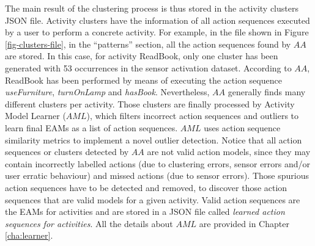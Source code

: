 The main result of the clustering process is thus stored in the activity clusters JSON file. Activity clusters have the information of all action sequences executed by a user to perform a concrete activity. For example, in the file shown in Figure \ref{fig-clusters-file}, in the ``patterns'' section, all the action sequences found by $AA$ are stored. In this case, for activity ReadBook, only one cluster has been generated with 53 occurrences in the sensor activation dataset. According to $AA$, ReadBook has been performed by means of executing the action sequence \textit{useFurniture}, \textit{turnOnLamp} and \textit{hasBook}. Nevertheless, $AA$ generally finds many different clusters per activity. Those clusters are finally processed by Activity Model Learner ($AML$), which filters incorrect action sequences and outliers to learn final EAMs as a list of action sequences. $AML$ uses action sequence similarity metrics to implement a novel outlier detection. Notice that all action sequences or clusters detected by $AA$ are not valid action models, since they may contain incorrectly labelled actions (due to clustering errors, sensor errors and/or user erratic behaviour) and missed actions (due to sensor errors). Those spurious action sequences have to be detected and removed, to discover those action sequences that are valid models for a given activity. Valid action sequences are the EAMs for activities and are stored in a JSON file called \textit{learned action sequences for activities}. All the details about $AML$ are provided in Chapter \ref{cha:learner}.